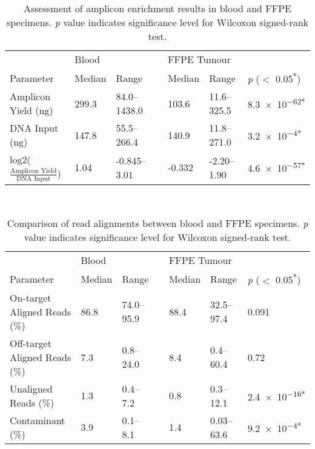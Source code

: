 
\begin{table}[H]
\caption{Assessment of amplicon enrichment results in blood and FFPE specimens. \textit{p} value indicates significance level for Wilcoxon signed-rank test.}
\label{tbl:amplicon_generation}
			\begin{tabular}{lllllll}
				\hline
			 \multicolumn{1}{l}{ }
			 &
			 \multicolumn{2}{l}{Blood}
			 &&
			 \multicolumn{2}{l}{FFPE Tumour}
			 &
			 \multicolumn{1}{l}{ } \\
			 \cline{2-3}\cline{5-6}
			 Parameter & Median & Range && Median & Range & \textit{p} ($<$ 0.05\textsuperscript{*})
			 \\
			 \hline
			 Amplicon Yield (ng) & 299.3 & 84.0--1438.0 && 103.6 & 11.6--325.5 & \num{8.3e-62}\textsuperscript{*}
			 \\
			 DNA Input (ng) & 147.8 & 55.5--266.4 && 140.9 & 11.8--271.0 & \num{3.2e-4}\textsuperscript{*}
			 \\
			 log2(\( \frac{\text{Amplicon Yield}}{\text{DNA Input}} \)) & 1.04 & -0.845--3.01 && -0.332 & -2.20--1.90 & \num{4.6e-57}\textsuperscript{*}
			 \\
			 \hline
			\end{tabular} \\
\end{table}


\begin{table}[H]
\caption{Comparison of read alignments between blood and FFPE specimens. \textit{p} value indicates significance level for Wilcoxon signed-rank test.}
\label{tbl:alignment}
      \begin{tabular}{lllllll}
        \hline
				\multicolumn{1}{l}{ }
				&
				\multicolumn{2}{l}{Blood}
				&&
				\multicolumn{2}{l}{FFPE Tumour}
				&
				\multicolumn{1}{l}{ } \\
				\cline{2-3}\cline{5-6}
        Parameter & Median & Range && Median & Range & \textit{p} ($<$ 0.05\textsuperscript{*})
				\\
				\hline
				On-target Aligned Reads (\%) & 86.8 & 74.0--95.9 && 88.4 & 32.5--97.4 & \num{0.091}
				\\
				Off-target Aligned Reads (\%) & 7.3 & 0.8--24.0 && 8.4 & 0.4--60.4 & \num{0.72}
				\\
				Unaligned Reads (\%) & 1.3 & 0.4--7.2 && 0.8 & 0.3--12.1 & \num{2.4e-16}\textsuperscript{*}
				\\
				Contaminant (\%) & 3.9 & 0.1--8.1 && 1.4 & 0.03--63.6 &
				\num{9.2e-4}\textsuperscript{*}
				\\
				\hline
      \end{tabular} \\
\end{table}

